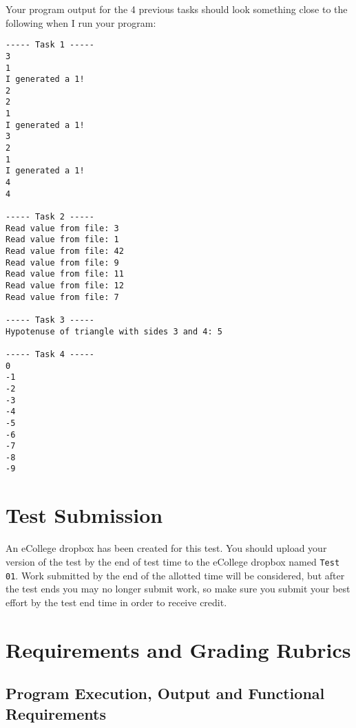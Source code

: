 \documentclass[11pt]{article}
\begin{document}
Your program output for the 4 previous tasks should look something
close to the following when I run your program:

\begin{verbatim}
----- Task 1 -----
3
1
I generated a 1!
2
2
1
I generated a 1!
3
2
1
I generated a 1!
4
4

----- Task 2 -----
Read value from file: 3
Read value from file: 1
Read value from file: 42
Read value from file: 9
Read value from file: 11
Read value from file: 12
Read value from file: 7

----- Task 3 -----
Hypotenuse of triangle with sides 3 and 4: 5

----- Task 4 -----
0
-1
-2
-3
-4
-5
-6
-7
-8
-9
\end{verbatim}
\section*{Test Submission}
\label{sec-3}

An eCollege dropbox has been created for this test.  You should upload
your version of the test by the end of test time to the eCollege
dropbox named \verb~Test 01~.  Work submitted by the end of the allotted
time will be considered, but after the test ends you may no longer
submit work, so make sure you submit your best effort by the test end
time in order to receive credit.
\section*{Requirements and Grading Rubrics}
\label{sec-4}

\subsection*{Program Execution, Output and Functional Requirements}
\label{sec-4-1}
\end{document}
